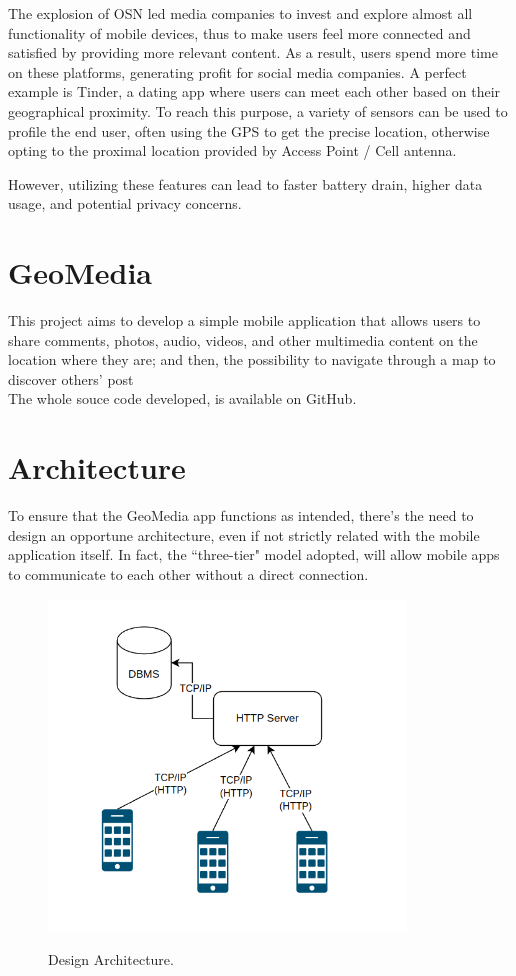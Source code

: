 \documentclass[conference]{IEEEtran}
\begin{document}
The explosion of OSN led media companies to invest and explore almost all functionality of mobile devices, thus to make users feel more connected and satisfied by providing more relevant content. As a result, users spend more time on these platforms, generating profit for social media companies.
A perfect example is Tinder, a dating app where users can meet each other based on their geographical proximity.
To reach this purpose, a variety of sensors can be used to profile the end user, often using the GPS to get the precise location, otherwise opting to the proximal location provided by Access Point / Cell antenna.

However, utilizing these features can lead to faster battery drain, higher data usage, and potential privacy concerns.
\\

\section{GeoMedia}

This project aims to develop a simple mobile application that allows users to share comments, photos, audio, videos, and other multimedia content on the location where they are; and then, the possibility to navigate through a map to discover others' post
\\

The whole souce code developed, is available on GitHub. \cite{gh}


\section{Architecture}


To ensure that the GeoMedia app functions as intended, there's the need to design an opportune architecture, even if not strictly related with the mobile application itself.
In fact, the ``three-tier" model adopted, will allow mobile apps to communicate to each other without a direct connection.

\begin{figure}[htbp]
{\includegraphics[width=9.5cm]{imgs/Architecture.png}}
\caption{Design Architecture.}
\label{fig}
\end{figure}
\end{document}

